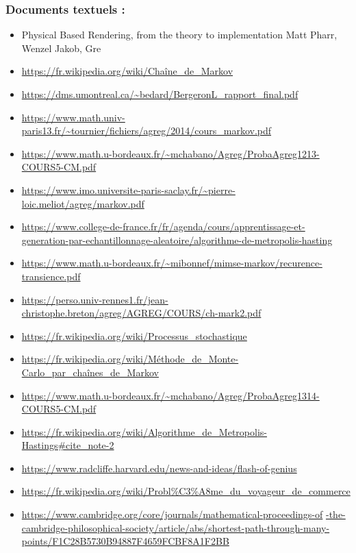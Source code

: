 \documentclass{article}
\begin{document}
\subsubsection{Documents textuels :}
\begin{itemize}
    \item Physical Based Rendering, from the theory to implementation Matt Pharr, Wenzel Jakob, Gre
    \item \url{https://fr.wikipedia.org/wiki/Chaîne_de_Markov}
    \item \url{https://dms.umontreal.ca/~bedard/BergeronL_rapport_final.pdf}
    \item \url{https://www.math.univ-paris13.fr/~tournier/fichiers/agreg/2014/cours_markov.pdf}
    \item \url{https://www.math.u-bordeaux.fr/~mchabano/Agreg/ProbaAgreg1213-COURS5-CM.pdf}
    \item \url{https://www.imo.universite-paris-saclay.fr/~pierre-loic.meliot/agreg/markov.pdf}
    \item \url{https://www.college-de-france.fr/fr/agenda/cours/apprentissage-et-generation-par-echantillonnage-aleatoire/algorithme-de-metropolis-hasting}
    \item \url{https://www.math.u-bordeaux.fr/~mibonnef/mimse-markov/recurence-transience.pdf}
    \item \url{https://perso.univ-rennes1.fr/jean-christophe.breton/agreg/AGREG/COURS/ch-mark2.pdf}
    \item \url{https://fr.wikipedia.org/wiki/Processus_stochastique}
    \item \url{https://fr.wikipedia.org/wiki/Méthode_de_Monte-Carlo_par_chaînes_de_Markov}
    \item \url{https://www.math.u-bordeaux.fr/~mchabano/Agreg/ProbaAgreg1314-COURS5-CM.pdf}
    \item \url{https://fr.wikipedia.org/wiki/Algorithme_de_Metropolis-Hastings#cite_note-2}
    \item \url{https://www.radcliffe.harvard.edu/news-and-ideas/flash-of-genius}
    \item \url{https://fr.wikipedia.org/wiki/Probl\%C3\%A8me_du_voyageur_de_commerce}
    \item \url{https://www.cambridge.org/core/journals/mathematical-proceedings-of} \url{-the-cambridge-philosophical-society/article/abs/shortest-path-through-many-points/F1C28B5730B94887F4659FCBF8A1F2BB} \\ %
\end{itemize}
\end{document}
